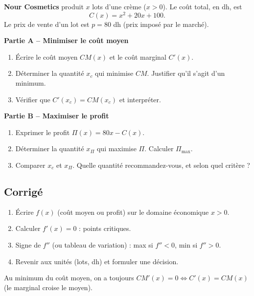 \documentclass[12pt,a4paper]{article}
\begin{document}
\begin{exobox}
\textbf{Nour Cosmetics} produit $x$ lots d'une crème ($x>0$). Le coût total, en dh, est
$$C(x) = x^2 + 20x + 100.$$
Le prix de vente d'un lot est $p=80$ dh (prix imposé par le marché).

\textbf{Partie A -- Minimiser le coût moyen}
\begin{enumerate}[label=\alph*)]
  \item Écrire le coût moyen $CM(x)$ et le coût marginal $C'(x)$.
  \item Déterminer la quantité $x_c$ qui minimise $CM$. Justifier qu'il s'agit d'un minimum.
  \item Vérifier que $C'(x_c)=CM(x_c)$ et interpréter.
\end{enumerate}

\textbf{Partie B -- Maximiser le profit}
\begin{enumerate}[label=\alph*), resume]
  \item Exprimer le profit $\Pi(x)=80x-C(x)$.
  \item Déterminer la quantité $x_\Pi$ qui maximise $\Pi$. Calculer $\Pi_{\max}$.
  \item Comparer $x_c$ et $x_\Pi$. Quelle quantité recommandez-vous, et selon quel critère ?
\end{enumerate}
\end{exobox}

\subsection{Corrigé}

\begin{methodebox}
\begin{enumerate}[leftmargin=1.3cm]
  \item Écrire $f(x)$ (coût moyen ou profit) sur le domaine économique $x>0$.
  \item Calculer $f'(x)=0$ : points critiques.
  \item Signe de $f''$ (ou tableau de variation) : max si $f''<0$, min si $f''>0$.
  \item Revenir aux unités (lots, dh) et formuler une décision.
\end{enumerate}
Au minimum du coût moyen, on a toujours $CM'(x)=0 \Leftrightarrow C'(x)=CM(x)$ (le marginal croise le moyen).
\end{methodebox}
\end{document}
